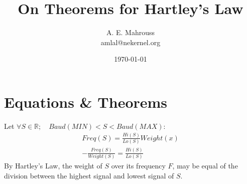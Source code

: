 \documentclass[10pt, twocolumn]{article}
\title{%
  \vspace{-1.5em}%
  \large\textbf{On Theorems for Hartley's Law}%
}
\author{A. E. Mahrouss\\amlal@nekernel.org}
\date{\today}
\begin{document}
\twocolumn[{%
  \maketitle
  \vspace{-0.5em}
  \vspace{0.8em}
  \rule{\linewidth}{0.4pt}
  \vspace{1em}
}]

\section{Equations \& Theorems}
Let
$\forall S \in \mathbb{R}; \quad Baud(MIN) < S < Baud(MAX)$:
\begin{align*}
Freq(S) = \frac{Hi(S)}{Lo(S)} Weight(x)\\
-\frac{Freq(S)}{Weight(S)} = \frac{Hi(S)}{Lo(S)}
\end{align*}
By Hartley's Law, the weight of $S$ over its frequency $F$, may be equal of the division between the highest signal and lowest signal of $S$.

\nocite{*}



\end{document}
